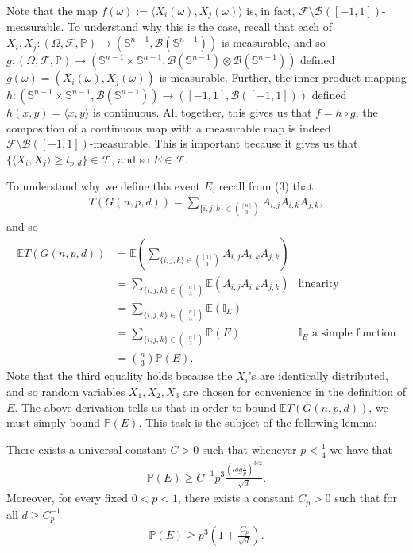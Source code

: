 \documentclass{article}
\newenvironment{manualtheorem}[1]{%
  \renewcommand\themanualtheoreminner{#1}%
  \manualtheoreminner
}{\endmanualtheoreminner}
\begin{document}
Note that the map $f(\omega) := \langle X_i(\omega), X_j(\omega) \rangle$ is, in fact, $\mathcal{F} \setminus \mathcal{B}([-1, 1])$-measurable. To understand why this is the case, recall that each of $X_i, X_j: (\Omega, \mathcal{F}, \mathbb{P}) \rightarrow (\mathbb{S}^{n-1}, \mathcal{B}(\mathbb{S}^{n-1}))$ is measurable, and so $g: (\Omega, \mathcal{F}, \mathbb{P}) \rightarrow (\mathbb{S}^{n-1} \times \mathbb{S}^{n-1}, \mathcal{B}(\mathbb{S}^{n-1}) \otimes \mathcal{B}(\mathbb{S}^{n-1}))$ defined $g(\omega) = (X_i(\omega), X_j(\omega))$ is measurable. Further, the inner product mapping $h: (\mathbb{S}^{n-1} \times \mathbb{S}^{n-1}, \mathcal{B}(\mathbb{S}^{n-1})) \rightarrow ([-1, 1], \mathcal{B}([-1, 1]))$ defined $h(x, y) = \langle x, y\rangle$ is continuous. All together, this gives us that $f = h \circ g$, the composition of a continuous map with a measurable map is indeed $\mathcal{F}\setminus \mathcal{B}([-1,1])$-measurable. This is important because it gives us that $\{ \langle X_i, X_j \rangle \geq t_{p,d} \} \in \mathcal{F}$, and so  $E \in \mathcal{F}$.

To understand why we define this event $E$, recall from (3) that 
\begin{align*}
  T(G(n,p,d)) = \sum\limits_{\{i,j,k\} \in \binom{[n]}{3}} A_{i,j} A_{i,k} A_{j,k},  
\end{align*}
and so 
\begin{align*}
    \mathbb{E}T(G(n,p,d)) &= \mathbb{E} \left( \sum\limits_{\{i,j,k\} \in \binom{[n]}{3}} A_{i,j} A_{i,k} A_{j,k} \right)\\
    &= \sum\limits_{\{i,j,k\} \in \binom{[n]}{3}} \mathbb{E}(A_{i,j} A_{i,k} A_{j,k}) & \text{linearity}\\
    &= \sum\limits_{\{i,j,k\} \in \binom{[n]}{3}} \mathbb{E}(\mathbb{I}_{E})\\
    &= \sum\limits_{\{i,j,k\} \in \binom{[n]}{3}} \mathbb{P}(E)& \text{$\mathbb{I}_{E}$ a simple function}\\
    &= \binom{n}{3} \mathbb{P}(E).
\end{align*}
Note that the third equality holds because the $X_i$'s are identically distributed, and so random variables $X_1, X_2, X_3$ are chosen for convenience in the definition of $E$. The above derivation tells us that in order to bound $\mathbb{E}T(G(n,p,d))$, we must simply bound $\mathbb{P}(E)$. This task is the subject of the following lemma:

\begin{manualtheorem}{1}\label{lm:1}
There exists a universal constant $C > 0$ such that whenever $p < \frac{1}{4}$ we have that
\begin{align}
    \mathbb{P}(E) \geq C^{-1}p^3 \frac{(log\frac{1}{p})^{3/2}}{\sqrt{d}}.\label{eq1}
\end{align}
Moreover, for every fixed $0 < p <1$, there exists a constant $C_p > 0$ such that for all $d \geq C_p^{-1}$
\begin{align}
    \mathbb{P}(E) \geq p^3 \left(1 + \frac{C_p}{\sqrt{d}} \right).\label{eq2}
\end{align}
\end{manualtheorem}
\end{document}
